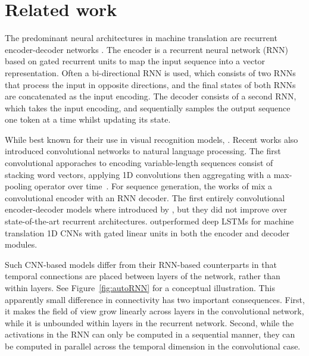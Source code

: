 \documentclass[11pt,a4paper]{article}
\def\fig#1{Figure~\ref{fig:#1}}
\begin{document}
\section{Related work}

The predominant neural architectures in machine translation are recurrent encoder-decoder networks \citep{graves12arxiv,sutskever14nips,cho14emnlp}.
The encoder is a recurrent neural network (RNN) based on gated recurrent units \citep{hochreiter97neco,cho14emnlp} to  map the input sequence into a vector representation. 
Often a bi-directional RNN \citep{schuster97sp} is used, which consists of two RNNs that process the input in opposite directions, and the final states of both RNNs are concatenated as the input encoding. 
The decoder consists of a second RNN, which takes the input encoding, and sequentially samples the output sequence one token at a time
whilst updating its state.

While best known for their use in visual recognition models, 
\citep{oord16ssw, salimans17iclr, reed17icml, oord16nips}.
Recent works also introduced convolutional networks to natural language processing. The first convolutional apporaches to encoding variable-length sequences consist of stacking word vectors, applying 1D convolutions then aggregating with a max-pooling operator over time~\cite{collobert08icml, kalchbrenner14acl, kim14acl}.
For sequence generation, the works of \citet{ranzato16iclr,bahdanau17iclr,gehring17acl} mix a convolutional encoder with an RNN decoder. The first entirely convolutional encoder-decoder models where introduced by \citet{kalchbrenner16arxiv}, but they did not  improve over state-of-the-art recurrent architectures. \citet{gehring17icml} outperformed deep LSTMs for machine translation 1D CNNs with gated linear units \citep{meng15acl, oord16nips, dauphin17icml} in both the encoder and decoder modules.

Such CNN-based models differ from their RNN-based counterparts in that temporal connections are placed between layers of the network, rather than within layers. See \fig{autoRNN} for a conceptual illustration.  This apparently small difference in connectivity has two important consequences. First, it makes the field of view grow linearly across layers in the convolutional network, while it is unbounded within layers in the recurrent network. Second, while the activations in the RNN can only be computed in a sequential manner, they can be computed in parallel across the temporal dimension in the convolutional case.
\end{document}
